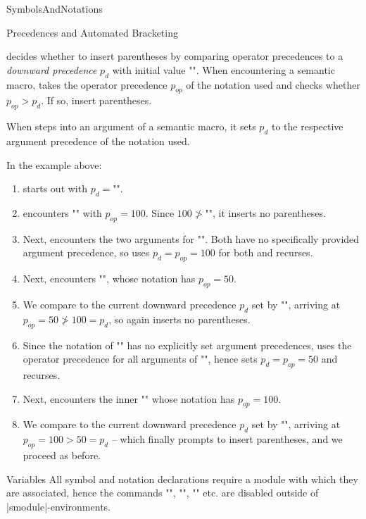\begin{smodule}[ns=https://github.com/slatex/sTeX/doc]{SymbolsAndNotations}
\begin{sfragment}{Precedences and Automated Bracketing}
\begin{dangerbox}
  \sTeX decides whether to insert parentheses by comparing operator precedences to a
  \emph{downward precedence} $p_d$ with initial value \stexcode"\infprec".  When
  encountering a semantic macro, \sTeX takes the operator precedence $p_{op}$ of the
  notation used and checks whether $p_{op}>p_d$. If so, \sTeX insert parentheses.

  When \sTeX steps into an argument of a semantic macro, it sets $p_d$ to the respective
  argument precedence of the notation used.

  In the example above:
  \begin{enumerate}
  \item \sTeX starts out with $p_d=$\stexcode"\infprec".
  \item \sTeX encounters \stexcode"\addition" with $p_{op}=100$. Since
    $100\not>$\stexcode"\infprec", it inserts no parentheses.
  \item Next, \sTeX encounters the two arguments for \stexcode"\addition".  Both have no
    specifically provided argument precedence, so \sTeX uses $p_d=p_{op}=100$ for both and
    recurses.
  \item Next, \sTeX encounters \stexcode"", whose notation has
    $p_{op}=50$.
  \item We compare to the current downward precedence $p_d$ set by \stexcode"\addition",
    arriving at $p_{op}=50\not>100=p_d$, so \sTeX again inserts no parentheses.
  \item Since the notation of \stexcode"\multiplication" has no explicitly set argument
    precedences, \sTeX uses the operator precedence for all arguments of
    \stexcode"\multiplication", hence sets $p_d=p_{op}=50$ and recurses.
  \item Next, \sTeX encounters the inner \stexcode"" whose notation has
    $p_{op}=100$.
  \item We compare to the current downward precedence $p_d$ set by
    \stexcode"\multiplication", arriving at $p_{op}=100>50=p_d$ -- which finally prompts
    \sTeX to insert parentheses, and we proceed as before.
  \end{enumerate}
\end{dangerbox}
\end{sfragment}

\begin{sfragment}{Variables}
  All symbol and notation declarations require a module with which they are associated,
  hence the commands \stexcode"\symdecl", \stexcode"\notation", \stexcode"\symdef"
  etc. are disabled outside of |smodule|-environments.


\end{sfragment}
\end{smodule}
